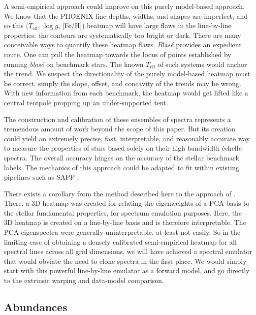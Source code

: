 \documentclass[twocolumn]{aastex631}
\begin{document}
A semi-empirical approach could improve on this purely model-based approach.  We know that the PHOENIX line depths, widths, and shapes are imperfect, and so this ($T_\mathrm{eff}$, $\log{g}$, [Fe/H]) heatmap will have large flaws in the line-by-line properties: the contours are systematically too bright or dark.  There are many conceivable ways to quantify these heatmap flaws.   \emph{Blas\'e} provides an expedient route.  One can pull the heatmap towards the locus of points established by running  \emph{blas\'e} on benchmark stars.  The known $T_\mathrm{eff}$ of such systems would anchor the trend.  We suspect the directionality of the purely model-based heatmap must be correct, simply the slope, offset, and concavity of the trends may be wrong. With new information from each benchmark, the heatmap would get lifted like a central tentpole propping up an under-supported tent.

The construction and calibration of these ensembles of spectra represents a tremendous amount of work beyond the scope of this paper.  But its creation could yield an extremely precise, fast, interpretable, and reasonably accurate way to measure the properties of stars based solely on their high bandwidth \'echelle spectra.  The overall accuracy hinges on the accuracy of the stellar benchmark labels.  The mechanics of this approach could be adapted to fit within existing pipelines such as SAPP \citep{2022A&A...658A.147G}.

There exists a corollary from the method described here to the approach of \citet{czekala15}.  There, a 3D heatmap was created for relating the eigenweights of a PCA basis to the stellar fundamental properties, for spectrum emulation purposes.  Here, the 3D heatmap is created on a line-by-line basis and is therefore interpretable.  The PCA eigenspectra were generally uninterpretable, at least not easily.  So in the limiting case of obtaining a densely calibrated semi-empirical heatmap for all spectral lines across all grid dimensions, we will have achieved a spectral emulator that would obviate the need to clone spectra in the first place.  We would simply start with this powerful line-by-line emulator as a forward model, and go directly to the extrinsic warping and data-model comparison.



\subsection{Abundances}\label{secAbundance}
\end{document}
